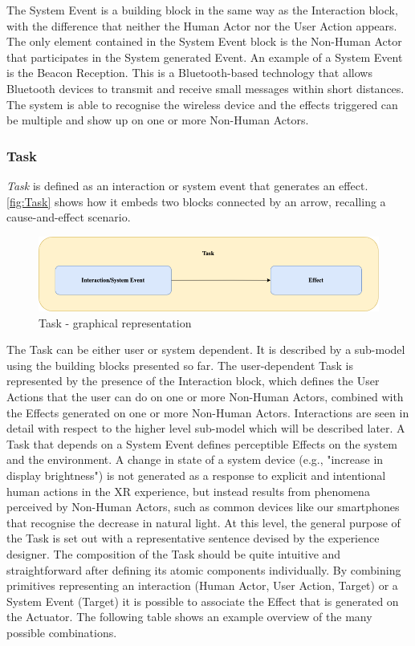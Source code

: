 The System Event is a building block in the same way as the Interaction block, with the difference that neither the Human Actor nor the User Action appears. The only element contained in the System Event block is the Non-Human Actor that participates in the System generated Event.
An example of a System Event is the Beacon Reception. This is a Bluetooth-based technology that allows Bluetooth devices to transmit and receive small messages within short distances. The system is able to recognise the wireless device and the effects triggered can be multiple and show up on one or more Non-Human Actors. 

\subsubsection*{Task}

\emph{Task} is defined as an interaction or system event that generates an effect. \autoref{fig:Task} shows how it embeds two blocks connected by an arrow, recalling a cause-and-effect scenario.
\begin{figure}[h]
	\centering
	\includegraphics[width=12cm]{Figures/Conceptual Model/Task.png}
	\caption{Task - graphical representation}
	\label{fig:Task}
\end{figure}

The Task can be either user or system dependent. It is described by a sub-model using the building blocks presented so far. 
The user-dependent Task is represented by the presence of the Interaction block, which defines the User Actions that the user can do on one or more Non-Human Actors, combined with the Effects generated on one or more Non-Human Actors. Interactions are seen in detail with respect to the higher level sub-model which will be described later. 
A Task that depends on a System Event defines perceptible Effects on the system and the environment. A change in state of a system device (e.g., "increase in display brightness") is not generated as a response to explicit and intentional human actions in the XR experience, but instead results from phenomena perceived by Non-Human Actors, such as common devices like our smartphones that recognise the decrease in natural light.
At this level, the general purpose of the Task is set out with a representative sentence devised by the experience designer. The composition of the Task should be quite intuitive and straightforward after defining its atomic components individually.
By combining primitives representing an interaction (Human Actor, User Action, Target) or a System Event (Target) it is possible to associate the Effect that is generated on the Actuator. The following table shows an example overview of the many possible combinations. 

